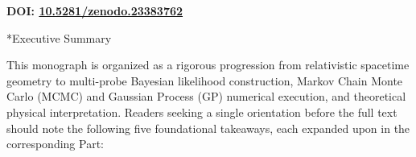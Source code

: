 \documentclass[11pt,letterpaper]{article}
\makeatletter
\renewcommand{\section}{\@startsection{section}{1}{\z@}%
  {-16pt \@plus -4pt \@minus -2pt}%
  {8pt \@plus 2pt}%
  {\normalfont\Large\bfseries\color{primary}}}
\let\orig@section\section
\renewcommand{\section}{\@ifstar{\star@section}{\nostar@section}}
\newcommand{\nostar@section}[1]{%
  \orig@section{#1}%
  \vspace{-6pt}\noindent{\color{tealaccent}\rule{\textwidth}{1.5pt}}\vspace{4pt}\par\nobreak%
}
\newcommand{\star@section}[1]{%
  \orig@section*{#1}%
  \vspace{-6pt}\noindent{\color{tealaccent}\rule{\textwidth}{1.5pt}}\vspace{4pt}\par\nobreak%
}
\makeatother
\begin{document}
\begin{center}
    \vfill
    {\normalsize\bfseries\color{tealaccent} DOI: \href{https://doi.org/10.5281/zenodo.23383762}{10.5281/zenodo.23383762}\par}
    \vspace*{0.6in}
\end{center}
\clearpage

\tableofcontents
\clearpage

\section*{Executive Summary}

This monograph is organized as a rigorous progression from relativistic spacetime geometry to multi-probe Bayesian likelihood construction, Markov Chain Monte Carlo (MCMC) and Gaussian Process (GP) numerical execution, and theoretical physical interpretation. Readers seeking a single orientation before the full text should note the following five foundational takeaways, each expanded upon in the corresponding Part:
\end{document}
